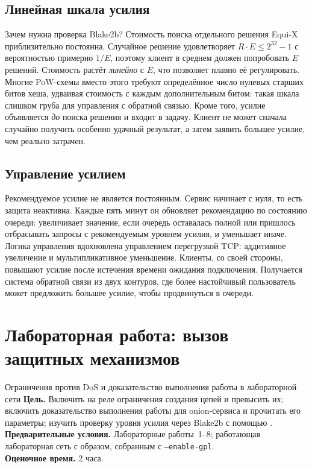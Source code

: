 \subsection{Линейная шкала усилия}

Зачем нужна проверка Blake2b? Стоимость поиска отдельного решения Equi-X приблизительно постоянна. Случайное решение удовлетворяет $R \cdot E \le 2^{32}-1$ с вероятностью примерно $1/E$, поэтому клиент в среднем должен попробовать $E$ решений. Стоимость растёт \emph{линейно} с $E$, что позволяет плавно её регулировать. Многие PoW-схемы вместо этого требуют определённое число нулевых старших битов хеша, удваивая стоимость с каждым дополнительным битом: такая шкала слишком груба для управления с обратной связью. Кроме того, усилие объявляется \emph{до} поиска решения и входит в задачу. Клиент не может сначала случайно получить особенно удачный результат, а затем заявить большее усилие, чем реально затрачен.

\subsection{Управление усилием}

Рекомендуемое усилие не является постоянным. Сервис начинает с нуля, то есть защита неактивна. Каждые пять минут он обновляет рекомендацию по состоянию очереди: увеличивает значение, если очередь оставалась полной или пришлось отбрасывать запросы с рекомендуемым уровнем усилия, и уменьшает иначе. Логика управления вдохновлена управлением перегрузкой TCP: аддитивное увеличение и мультипликативное уменьшение. Клиенты, со своей стороны, повышают усилие после истечения времени ожидания подключения. Получается система обратной связи из двух контуров, где более настойчивый пользователь может предложить большее усилие, чтобы продвинуться в очереди.

\section{Лабораторная работа: вызов защитных механизмов}\label{sec:lab-dos}

\begin{laboratorio}[9]{Ограничения против DoS и доказательство выполнения работы в лабораторной сети}
\textbf{Цель.} Включить на реле ограничения создания цепей и превысить их; включить доказательство выполнения работы для onion-сервиса и прочитать его параметры; изучить проверку уровня усилия через Blake2b с помощью .\\
\textbf{Предварительные условия.} Лабораторные работы~1--8; работающая лабораторная сеть с образом, собранным с \texttt{--enable-gpl}.\\
\textbf{Оценочное время.} 2 часа.
\end{laboratorio}

